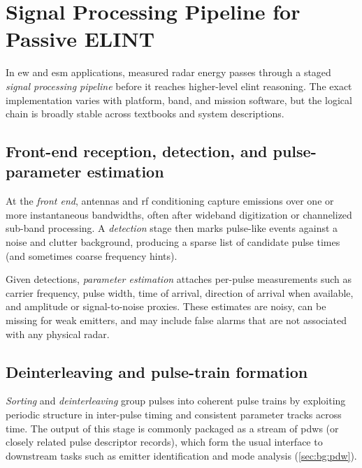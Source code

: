 \section{Signal Processing Pipeline for Passive ELINT}\label{sec:bg:elint_pipeline}

In \gls{ew} and \gls{esm} applications, measured radar energy passes through a staged \emph{signal processing pipeline} before it reaches higher-level \gls{elint} reasoning.
The exact implementation varies with platform, band, and mission software, but the logical chain is broadly stable across textbooks and system descriptions.

\subsection{Front-end reception, detection, and pulse-parameter estimation}

At the \emph{front end}, antennas and \gls{rf} conditioning capture emissions over one or more instantaneous bandwidths, often after wideband digitization or channelized sub-band processing.
A \emph{detection} stage then marks pulse-like events against a noise and clutter background, producing a sparse list of candidate pulse times (and sometimes coarse frequency hints).

Given detections, \emph{parameter estimation} attaches per-pulse measurements such as carrier frequency, pulse width, time of arrival, direction of arrival when available, and amplitude or signal-to-noise proxies.
These estimates are noisy, can be missing for weak emitters, and may include false alarms that are not associated with any physical radar.

\subsection{Deinterleaving and pulse-train formation}\label{sec:bg:deinterleaving_evolution}

\emph{Sorting} and \emph{deinterleaving} group pulses into coherent pulse trains by exploiting periodic structure in inter-pulse timing and consistent parameter tracks across time.
The output of this stage is commonly packaged as a stream of \glspl{pdw} (or closely related pulse descriptor records), which form the usual interface to downstream tasks such as emitter identification and mode analysis (\cref{sec:bg:pdw}).

